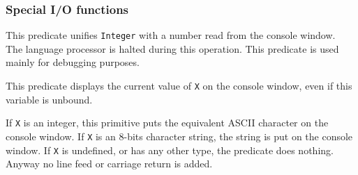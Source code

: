 \subsubsection{Special I/O functions}
\begin{itemize}

This predicate unifies \verb|Integer| with a number
read from the console window.\\
\Caution The language processor is halted during this operation. This
predicate is used mainly for debugging purposes.

This predicate displays the current value of \verb|X| on the console window,
even if this variable is unbound.

If \verb|X| is an integer, this primitive puts the equivalent ASCII character
on the console window.
If \verb|X| is an 8-bits character string,
the string is put on the console window.
If \verb|X| is undefined, or has any other type, the predicate does nothing.
Anyway no line feed or carriage return is added.

\end{itemize}
